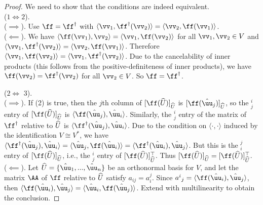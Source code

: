 \begin{proof}
    \mbox{} We need to show that the conditions are indeed equivalent.
    \\ \indent ($1 \iff 2$).
    \\ \indent ($\implies$). Use $\ff = \ff^\dag$ with $\langle \vv_1, \ff^\dag(\vv_2) \rangle = \langle \vv_2, \ff(\vv_1) \rangle$. 
    \\ \indent ($\impliedby$). We have $\langle \ff(\vv_1), \vv_2 \rangle = \langle \vv_1, \ff(\vv_2) \rangle$ for all $\vv_1, \vv_2 \in V$ and $\langle \vv_1, \ff^\dag(\vv_2) \rangle = \langle \vv_2, \ff(\vv_1) \rangle$. Therefore $\langle \vv_1, \ff(\vv_2) \rangle = \langle \vv_1, \ff^\dag(\vv_2) \rangle$. Due to the cancelability of inner products (this follows from the positive-definiteness of inner products), we have $\ff(\vv_2) = \ff^\dag(\vv_2)$ for all $\vv_2 \in V$. So $\ff = \ff^\dag$. 

    ($2 \iff $ 3). 
    \\ \indent ($\implies$). If (2) is true, then the $j$th column of $[\ff(\hU)]_{\hU}$ is $[\ff(\huu_j)]_{\hU}$, so the $^i_j$ entry of $[\ff(\hU)]_{\hU}$ is $\langle \ff(\huu_j), \huu_i \rangle$. Similarly, the $^i_j$ entry of the matrix of $\ff^\dag$ relative to $\widehat{U}$ is $\langle 
    \ff^\dag(\huu_j), \huu_i \rangle$. Due to the condition on $\langle \cdot, \cdot \rangle$ induced by the identification $V \cong V^*$, we have $\langle \ff^\dag(\huu_j), \huu_i \rangle = \langle \huu_j, \ff(\huu_i) \rangle = \langle \ff^\dag(\huu_i), \huu_j \rangle$. But this is the $^j_i$ entry of $[\ff(\hU)]_{\hU}$, i.e., the $^i_j$ entry of $[\ff(\hU)]_{\hU}^{\top}$. Thus $[\ff(\hU)]_{\hU} = [\ff(\hU)]_{\hU}^{\top}$.
    \\ \indent ($\impliedby$). Let $\hU = \{\huu_1, ..., \huu_n\}$ be an orthonormal basis for $V$, and let the matrix $\AA$ of $\ff$ relative to $\widehat{U}$ satisfy $a_{ij} = a^j_i$. Since $a^i{}_j = \langle \ff(\huu_i), \huu_j \rangle$, then $\langle \ff(\huu_i), \huu_j \rangle = \langle \huu_i, \ff(\huu_j) \rangle$. Extend with multilinearity to obtain the conclusion.
\end{proof}

